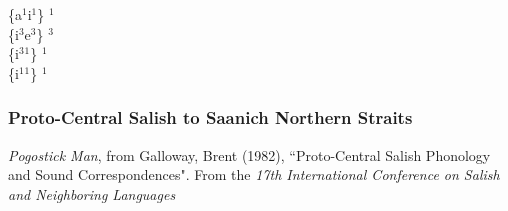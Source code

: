 \documentclass[11pt]{article}
\begin{document}
\{a$^1$\raisebox{-0.7ex}{\textasciitilde}i$^1$\} \textrightarrow\hspace{0pt} $^1$ \\
\{i$^3$\raisebox{-0.7ex}{\textasciitilde}e$^3$\} \textrightarrow\hspace{0pt} $^3$ \\
\{i$^3$\raisebox{-0.7ex}{\textasciitilde}$^1$\} \textrightarrow\hspace{0pt} $^1$ \\
\{i$^1$\raisebox{-0.7ex}{\textasciitilde}$^1$\} \textrightarrow\hspace{0pt} $^1$

\subsubsection{Proto-Central Salish to Saanich Northern Straits}\textit{Pogostick Man}, from Galloway, Brent (1982), \textquotedblleft Proto-Central Salish Phonology and Sound Correspondences". From the \textit{17th International Conference on Salish and Neighboring Languages}
\end{document}
